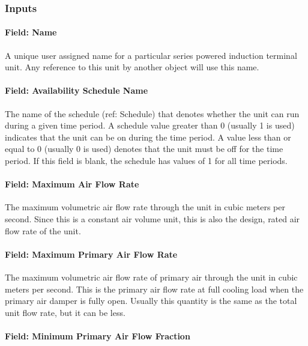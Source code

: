 \subsubsection{Inputs}\label{inputs-7-000}

\paragraph{Field: Name}\label{field-name-7-000}

A unique user assigned name for a particular series powered induction terminal unit. Any reference to this unit by another object will use this name.

\paragraph{Field: Availability Schedule Name}\label{field-availability-schedule-name-7}

The name of the schedule (ref: Schedule) that denotes whether the unit can run during a given time period. A schedule value greater than 0 (usually 1 is used) indicates that the unit can be on during the time period. A value less than or equal to 0 (usually 0 is used) denotes that the unit must be off for the time period. If this field is blank, the schedule has values of 1 for all time periods.

\paragraph{Field: Maximum Air Flow Rate}\label{field-maximum-air-flow-rate-6}

The maximum volumetric air flow rate through the unit in cubic meters per second. Since this is a constant air volume unit, this is also the design, rated air flow rate of the unit.

\paragraph{Field: Maximum Primary Air Flow Rate}\label{field-maximum-primary-air-flow-rate}

The maximum volumetric air flow rate of primary air through the unit in cubic meters per second. This is the primary air flow rate at full cooling load when the primary air damper is fully open. Usually this quantity is the same as the total unit flow rate, but it can be less.

\paragraph{Field: Minimum Primary Air Flow Fraction}\label{field-minimum-primary-air-flow-fraction}

